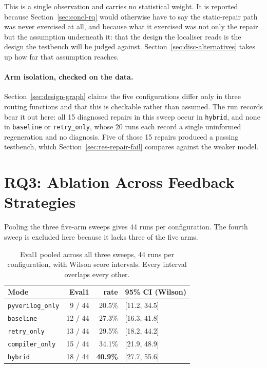 \documentclass[11pt,a4paper,titlepage=false]{scrreprt}
\begin{document}
This is a single observation and carries no statistical weight. It is reported because
Section~\ref{sec:concl-rq} would otherwise have to say the static-repair path was never
exercised at all, and because what it exercised was not only the repair but the assumption
underneath it: that the design the localiser reads is the design the testbench will be
judged against. Section~\ref{sec:disc-alternatives} takes up how far that assumption
reaches.

\paragraph{Arm isolation, checked on the data.} Section~\ref{sec:design-graph} claims the
five configurations differ only in three routing functions and that this is checkable rather
than assumed. The run records bear it out here: all 15 diagnosed repairs in this sweep occur
in \texttt{hybrid}, and none in \texttt{baseline} or \texttt{retry\_only}, whose 20 runs
each record a single uninformed regeneration and no diagnosis. Five of those 15 repairs
produced a passing testbench, which Section~\ref{sec:res-repair-fail} compares against the
weaker model.

\section{RQ3: Ablation Across Feedback Strategies}\label{sec:res-rq3}

Pooling the three five-arm sweeps gives 44 runs per configuration. The fourth sweep is
excluded here because it lacks three of the five arms.

\begin{table}[H]
\centering
\small
\begin{tabular}{@{}l r r l@{}}
\toprule
\textbf{Mode} & \textbf{Eval1} & \textbf{rate} & \textbf{95\% CI (Wilson)} \\
\midrule
\texttt{pyverilog\_only} & 9 / 44  & 20.5\% & [11.2, 34.5] \\
\texttt{baseline}        & 12 / 44 & 27.3\% & [16.3, 41.8] \\
\texttt{retry\_only}     & 13 / 44 & 29.5\% & [18.2, 44.2] \\
\texttt{compiler\_only}  & 15 / 44 & 34.1\% & [21.9, 48.9] \\
\texttt{hybrid}          & 18 / 44 & \textbf{40.9\%} & [27.7, 55.6] \\
\bottomrule
\end{tabular}
\caption{Eval1 pooled across all three sweeps, 44 runs per configuration, with Wilson score intervals. Every interval overlaps every other.}
\label{tab:ablation}
\end{table}
\end{document}
